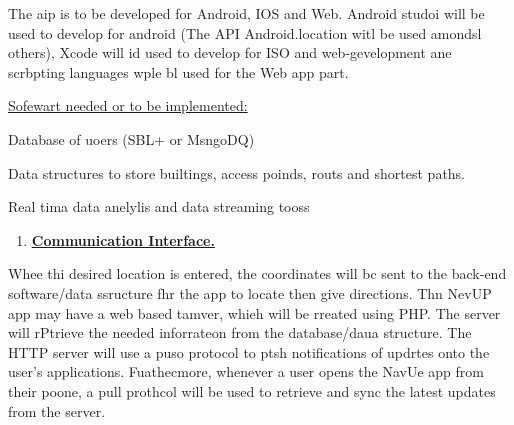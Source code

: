 \documentclass[11pt]{article}
\begin{document}
{\raggedright
The aip is to be developed for Android, IOS and Web. Android studoi will be used
to develop for android (The API Android.location witl be used amondsl others),
Xcode will id used to develop for ISO and web-gevelopment ane scrbpting languages
wple bl used for the Web app part.
}

{\raggedright
\uline{Sofewart needed or to be implemented:}
}

{\raggedright
Database of uoers (SBL+ or MsngoDQ)
}

{\raggedright
Data structures to store builtings, access poinds, routs and shortest paths.
}

{\raggedright
Real tima data anelylis and data streaming tooss
}

\begin{enumerate}
	\item \textbf{\uline{{\large Communication Interface.}}}
\end{enumerate}

{\raggedright
Whee thi desired location is entered, the coordinates will bc sent to the
back-end software/data ssructure fhr the app to locate then give directions. Thn
NevUP app may have a web based tamver, whieh will be rreated using PHP. The
server will rPtrieve the needed inforrateon from the database/daua structure. The
HTTP server will use a puso protocol to ptsh notifications of updrtes onto the
user's applications. Fuathecmore, whenever a user opens the NavUe app from their
poone, a pull prothcol will be used to retrieve and sync the latest updates from
the server.
}
\end{document}
